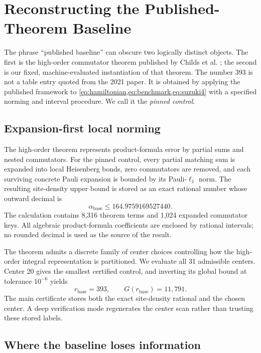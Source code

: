 \section{Reconstructing the Published-Theorem Baseline}
\label{sec:baseline}

The phrase ``published baseline'' can obscure two logically distinct objects.
The first is the high-order commutator theorem published by Childs et al.
\cite{childs2021trotter}; the second is our fixed, machine-evaluated
instantiation of that theorem.  The number 393 is not a table entry quoted
from the 2021 paper.  It is obtained by applying the published framework to
\cref{eq:hamiltonian,eq:benchmark,eq:suzuki4} with a specified norming and
interval procedure.  We call it the \emph{pinned control}.

\subsection{Expansion-first local norming}

The high-order theorem represents product-formula error by partial sums and
nested commutators.  For the pinned control, every partial matching sum is
expanded into local Heisenberg bonds, zero commutators are removed, and each
surviving concrete Pauli expansion is bounded by its Pauli-$\ell_1$ norm.
The resulting site-density upper bound is stored as an exact rational number
whose outward decimal is
\begin{equation}
 \alpha_{\mathrm{base}}\le164.9759169527440.
\end{equation}
The calculation contains 8,316 theorem terms and 1,024 expanded commutator
keys.  All algebraic product-formula coefficients are enclosed by rational
intervals; no rounded decimal is used as the source of the result.

The theorem admits a discrete family of center choices controlling how the
high-order integral representation is partitioned.  We evaluate all 31
admissible centers.  Center 20 gives the smallest certified control, and
inverting its global bound at tolerance $10^{-6}$ yields
\begin{equation}
 r_{\mathrm{base}}=393,\qquad G(r_{\mathrm{base}})=11{,}791.
\end{equation}
The main certificate stores both the exact site-density rational and the
chosen center.  A deep verification mode regenerates the center scan rather
than trusting these stored labels.

\subsection{Where the baseline loses information}

